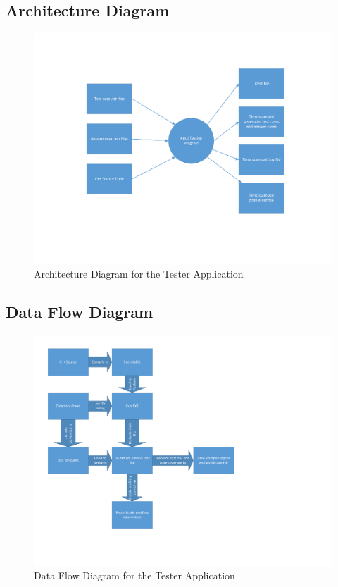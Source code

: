 \subsection{Architecture  Diagram}
\begin{figure}[H]
\begin{center}
\includegraphics[width=1.0\textwidth]{./ArchitectDiagram}
\end{center}
\caption{Architecture Diagram for the Tester Application \label{arch_generic}}
\end{figure}


\subsection{Data Flow Diagram} 



\begin{figure}[H]
\begin{center}
\includegraphics[width=1.45\textwidth]{./dataflow}
\end{center}
\caption{ Data Flow Diagram for the Tester Application \label{dataflow}}
\end{figure}


